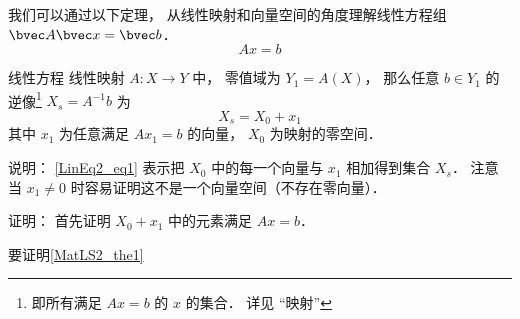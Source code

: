 

我们可以通过以下定理， 从线性映射和向量空间的角度理解线性方程组 $\bvec A \bvec x = \bvec b$．
\begin{equation}
Ax = b
\end{equation}

\begin{theorem}{线性方程}
线性映射 $A:X\to Y$ 中， 零值域为 $Y_1 = A(X)$， 那么任意 $b \in Y_1$ 的逆像\footnote{即所有满足 $Ax = b$ 的 $x$ 的集合． 详见 “映射”} $X_s = A^{-1}b$ 为
\begin{equation}\label{LinEq2_eq1}
X_s = X_0 + x_1
\end{equation}
其中 $x_1$ 为任意满足 $Ax_1 = b$ 的向量，  $X_0$ 为映射的零空间．
\end{theorem}
说明： \autoref{LinEq2_eq1} 表示把 $X_0$ 中的每一个向量与 $x_1$ 相加得到集合 $X_s$． 注意当 $x_1 \ne 0$ 时容易证明这不是一个向量空间（不存在零向量）．

证明： 首先证明 $X_0 + x_1$ 中的元素满足 $Ax = b$．

要证明\autoref{MatLS2_the1}~
